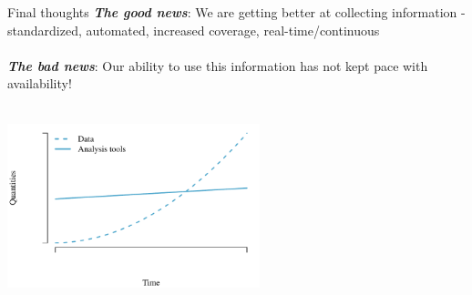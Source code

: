 \documentclass[serif]{beamer}\usepackage[]{graphicx}\usepackage[]{color}
\newcommand{\emtxt}[1]{\textbf{\textit{#1}}}
\begin{document}
\begin{frame}{Final thoughts}{}
\onslide<+->
\emtxt{The good news}: We are getting better at collecting information - standardized, automated, increased coverage, real-time/continuous \\~\\
\emtxt{The bad news}: Our ability to use this information has not kept pace with availability! \\~\\
\onslide<+->


{\centering \includegraphics[width=0.55\textwidth]{fig/theo-1} 

}



\end{frame}
\end{document}
